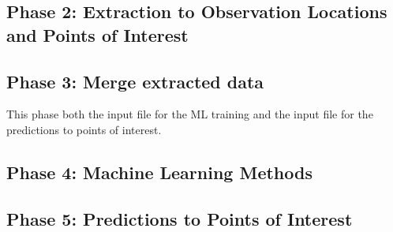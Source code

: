 \documentclass[letterpaper,12pt]{article}
\begin{document}











\pagebreak
\subsection{Phase 2: Extraction to Observation Locations and Points of Interest}


\pagebreak
\subsection{Phase 3: Merge extracted data}

This phase both the input file for the ML training and the input file for the predictions to points of interest.



\pagebreak
\subsection{Phase 4: Machine Learning Methods} 



\pagebreak
\subsection{Phase 5: Predictions to Points of Interest} 







%

\end{document}
